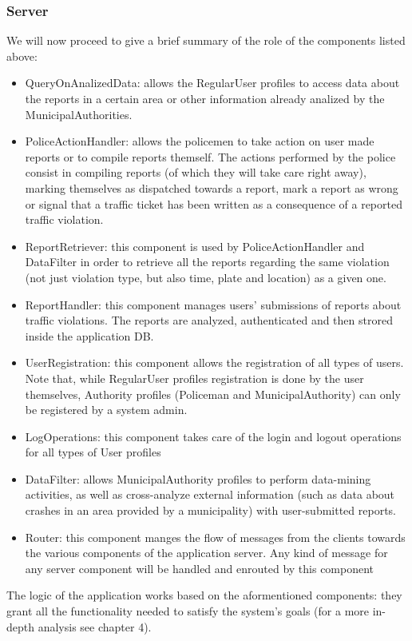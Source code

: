 \subsubsection{Server}
We will now proceed to give a brief summary of the role of the components listed above:
\begin{itemize}
\item QueryOnAnalizedData: allows the RegularUser profiles to access data about the reports in a certain area or other information already analized by the MunicipalAuthorities.
\item PoliceActionHandler: allows the policemen to take action on user made reports or to compile reports themself. The actions performed by the police consist in compiling reports (of which they will take care right away), marking themselves as dispatched towards a report, mark a report as wrong or signal that a traffic ticket has been written as a consequence of a reported traffic violation.
\item ReportRetriever: this component is used by PoliceActionHandler and DataFilter in order to retrieve all the reports regarding the same violation (not just violation type, but also time, plate and location) as a given one. 
\item ReportHandler: this component manages users' submissions of reports about traffic violations. The reports are analyzed, authenticated and then strored inside the application DB.
\item UserRegistration: this component allows the registration of all types of users. Note that, while RegularUser profiles registration is done by the user themselves, Authority profiles (Policeman and MunicipalAuthority) can only be registered by a system admin.
\item LogOperations: this component takes care of the login and logout operations for all types of User profiles
\item DataFilter: allows MunicipalAuthority profiles to perform data-mining activities,  as well as cross-analyze external information (such as data about crashes in an area provided by a municipality) with user-submitted reports.
\item Router: this component manges the flow of messages from the clients towards the various components of the application server. Any kind of message for any server component will be handled and enrouted by this component
\end{itemize}
The logic of the application works based on the aformentioned components: they grant all the functionality needed to satisfy the system's goals (for a more in-depth analysis see chapter 4).
